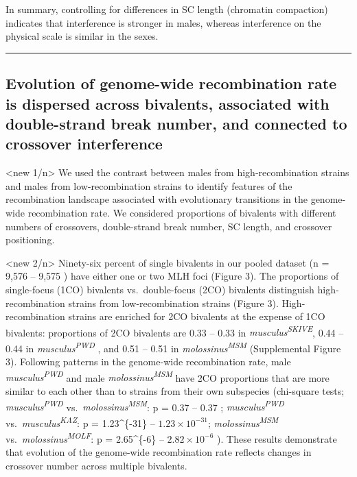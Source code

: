 \documentclass[
]{article}
\begin{document}
In summary, controlling for differences in SC length (chromatin
compaction) indicates that interference is stronger in males, whereas
interference on the physical scale is similar in the sexes.

\begin{center}\rule{0.5\linewidth}{0.5pt}\end{center}

\hypertarget{evolution-of-genome-wide-recombination-rate-is-dispersed-across-bivalents-associated-with-double-strand-break-number-and-connected-to-crossover-interference}{%
\subsection{Evolution of genome-wide recombination rate is dispersed
across bivalents, associated with double-strand break number, and
connected to crossover
interference}\label{evolution-of-genome-wide-recombination-rate-is-dispersed-across-bivalents-associated-with-double-strand-break-number-and-connected-to-crossover-interference}}

\textless new 1/n\textgreater{} We used the contrast between males from
high-recombination strains and males from low-recombination strains to
identify features of the recombination landscape associated with
evolutionary transitions in the genome-wide recombination rate. We
considered proportions of bivalents with different numbers of
crossovers, double-strand break number, SC length, and crossover
positioning.

\textless new 2/n\textgreater{} Ninety-six percent of single bivalents
in our pooled dataset (n = 9,576 -- 9,575 ) have either one or two MLH
foci (Figure 3). The proportions of single-focus (1CO) bivalents
vs.~double-focus (2CO) bivalents distinguish high-recombination strains
from low-recombination strains (Figure 3). High-recombination strains
are enriched for 2CO bivalents at the expense of 1CO bivalents:
proportions of 2CO bivalents are 0.33 -- 0.33 in
\emph{musculus\textsuperscript{SKIVE}}, 0.44 -- 0.44 in
\emph{musculus\textsuperscript{PWD}} , and 0.51 -- 0.51 in
\emph{molossinus\textsuperscript{MSM}} (Supplemental Figure 3).
Following patterns in the genome-wide recombination rate, male
\emph{musculus\textsuperscript{PWD}} and male
\emph{molossinus\textsuperscript{MSM}} have 2CO proportions that are
more similar to each other than to strains from their own subspecies
(chi-square tests; \emph{musculus\textsuperscript{PWD}}
vs.~\emph{molossinus\textsuperscript{MSM}}: p = 0.37 -- 0.37 ;
\emph{musculus\textsuperscript{PWD}}
vs.~\emph{musculus\textsuperscript{KAZ}}: p = 1.23\^{}\{-31\} --
\ensuremath{1.23\times 10^{-31}}; \emph{molossinus\textsuperscript{MSM}}
vs.~\emph{molossinus\textsuperscript{MOLF}}: p = 2.65\^{}\{-6\} --
\ensuremath{2.82\times 10^{-6}} ). These results demonstrate that
evolution of the genome-wide recombination rate reflects changes in
crossover number across multiple bivalents.
\end{document}
